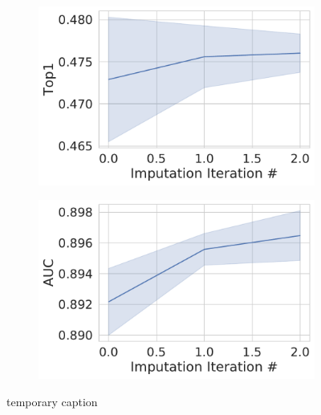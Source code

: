 \documentclass[journal=jmcmar,manuscript=article]{achemso}
\begin{document}
\begin{figure}[tbph]
    \begin{subfigure}[t]{0.48\textwidth}
        \centering
        \includegraphics[width=\linewidth]{figures/MedGOEnsTop1.pdf}
    \end{subfigure}
    \hfill
    \begin{subfigure}[t]{0.48\textwidth}
        \centering
        \includegraphics[width=\linewidth]{figures/MedGOEnsAUC.pdf}
    \end{subfigure}
    \caption{temporary caption}
    \label{fig:medGOEnsOverall}
\end{figure}
\end{document}
